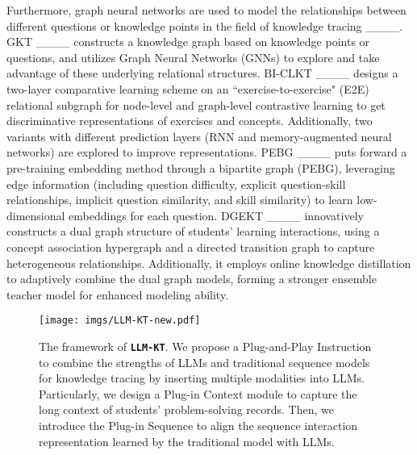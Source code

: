 Furthermore, graph neural networks are used to model the relationships between different questions or knowledge points in the field of knowledge tracing ____. 
GKT ____ constructs a knowledge graph based on knowledge points or questions, and utilizes Graph Neural Networks (GNNs) to explore and take advantage of these underlying relational structures. 
BI-CLKT ____ designs a two-layer comparative learning scheme on an ``exercise-to-exercise" (E2E) relational subgraph for node-level and graph-level contrastive learning to get discriminative representations of exercises and concepts. Additionally, two variants with different prediction layers (RNN and memory-augmented neural networks) are explored to improve representations.
PEBG ____ puts forward a pre-training embedding method through a bipartite graph (PEBG), leveraging edge information (including question difficulty, explicit question-skill relationships, implicit question similarity, and skill similarity) to learn low-dimensional embeddings for each question. 
DGEKT ____ innovatively constructs a dual graph structure of students' learning interactions, using a concept association hypergraph and a directed transition graph to capture heterogeneous relationships. Additionally, it employs online knowledge distillation to adaptively combine the dual graph models, forming a stronger ensemble teacher model for enhanced modeling ability.



\begin{figure*}[!t]
\begin{center}
\texttt{[image: imgs/LLM-KT-new.pdf]}
\end{center}
\caption{The framework of \texttt{\textbf{LLM-KT}}. We propose a Plug-and-Play Instruction to combine the strengths of LLMs and traditional sequence models for knowledge tracing by inserting multiple modalities into LLMs. Particularly, we design a Plug-in Context module to capture the long context of students' problem-solving records. Then, we introduce the Plug-in Sequence to align the sequence interaction representation learned by the traditional model with LLMs.} 
\label{fig:main}
\end{figure*}



